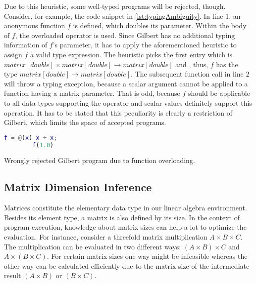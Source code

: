 Due to this heuristic, some well-typed programs will be rejected, though.
Consider, for example, the code snippet in \cref{lst:typingAmbiguity}.
In line $1$, an anonymous function $f$ is defined, which doubles its parameter.
Within the body of $f$, the overloaded \code{+} operator is used.
Since Gilbert has no additional typing information of $f$'s parameter, it has to apply the aforementioned heuristic to assign $f$ a valid type expression.
The heuristic picks the first entry which is $matrix[double] \times matrix[double] \rightarrow matrix[double]$ and , thus, $f$ has the type $matrix[double] \rightarrow matrix[double]$.
The subsequent function call  in line $2$ will throw a typing exception, because a scalar argument cannot be applied to a function having a matrix parameter.
That is odd, because $f$ should be applicable to all data types supporting the \code{+} operator and scalar values definitely support this operation.
It has to be stated that this peculiarity is clearly a restriction of Gilbert, which limits the space of accepted programs.

\begin{listing}[!h]
	\begin{CenteredBox}
		\begin{lstlisting}[language=Matlab]
		f = @(x) x + x;
		f(1.0)
		\end{lstlisting}
	\end{CenteredBox}
	\caption{Wrongly rejected Gilbert program due to function overloading.}
	\label{lst:typingAmbiguity}
\end{listing}

\subsection{Matrix Dimension Inference}
\label{sec:MatrixDimensionInference}

Matrices constitute the elementary data type in our linear algebra environment.
Besides its element type, a matrix is also defined by its size.
In the context of program execution, knowledge about matrix sizes can help a lot to optimize the evaluation.
For instance, consider a threefold matrix multiplication $A\times B\times C$.
The multiplication can be evaluated in two different ways: $(A\times B)\times C$ and $A\times(B\times C)$.
For certain matrix sizes one way might be infeasible whereas the other way can be calculated efficiently due to the matrix size of the intermediate result $(A\times B)$ or $(B\times C)$.

